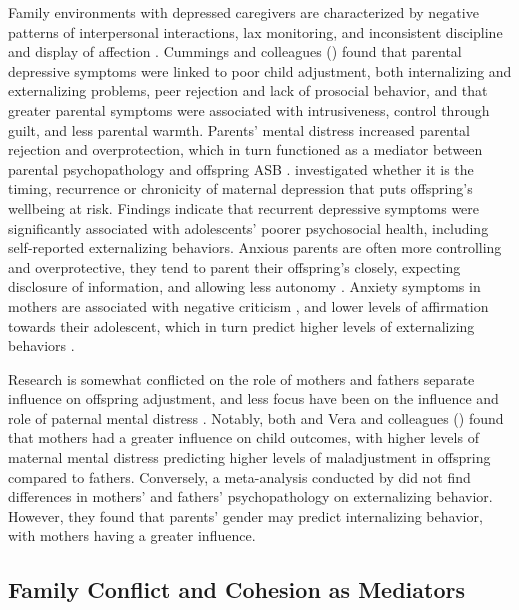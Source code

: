 \documentclass{sn-jnl}                  %
\begin{document}
Family environments with depressed caregivers are characterized by negative patterns of interpersonal interactions, lax monitoring, and inconsistent discipline and display of affection \citep{elgar:2007, korhonen:2014}. Cummings and colleagues (\citeyear{cummings:2005}) found that parental depressive symptoms were linked to poor child adjustment, both internalizing and externalizing problems, peer rejection and lack of prosocial behavior, and that greater parental symptoms were associated with intrusiveness, control through guilt, and less parental warmth. Parents' mental distress increased parental rejection and overprotection, which in turn functioned as a mediator between parental psychopathology and offspring ASB \citep{vera:2012}. \citet{korhonen:2014} investigated whether it is the timing, recurrence or chronicity of maternal depression that puts offspring's wellbeing at risk. Findings indicate that recurrent depressive symptoms were significantly associated with adolescents' poorer psychosocial health, including self-reported externalizing behaviors. Anxious parents are often more controlling and overprotective, they tend to parent their offspring's closely, expecting disclosure of information, and allowing less autonomy \citep{jones:2021, vera:2012}. Anxiety symptoms in mothers are associated with negative criticism \citep{hirshfeld:1997}, and lower levels of affirmation towards their adolescent, which in turn predict higher levels of externalizing behaviors \citep{bellina:2020}.

Research is somewhat conflicted on the role of mothers and fathers separate influence on offspring adjustment, and less focus have been on the influence and role of paternal mental distress \citep{cummings:2005, sweeney:2016}. Notably, both \citet{marmorstein:2004} and Vera and colleagues (\citeyear{vera:2012}) found that mothers had a greater influence on child outcomes, with higher levels of maternal mental distress predicting higher levels of maladjustment in offspring compared to fathers. Conversely, a meta-analysis conducted by \citet{connell:2002} did not find differences in mothers' and fathers' psychopathology on externalizing behavior. However, they found that parents' gender may predict internalizing behavior, with mothers having a greater influence.

\subsection{Family Conflict and Cohesion as Mediators}
\end{document}
